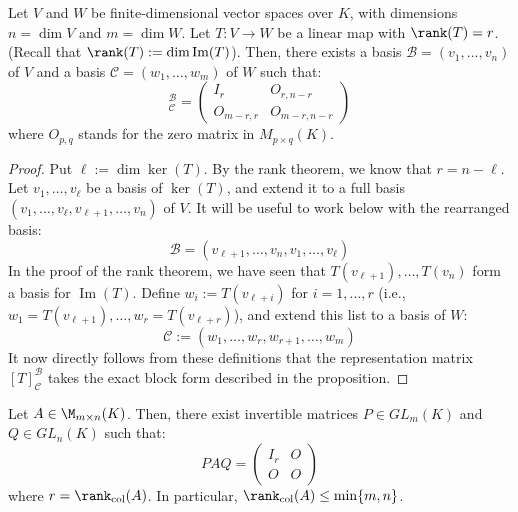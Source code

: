 \begin{proposition}
\label{prop:linear_map_normal_form}
Let $V$ and $W$ be finite-dimensional vector spaces over $K$, with dimensions $n = \dim V$ and $m = \dim W$. Let $T: V \to W$ be a linear map with $\rank(T) = r$. (Recall that $\rank(T) := \dim \operatorname{Im}(T)$). Then, there exists a basis $\mathcal{B} = (v_1, \dots, v_n)$ of $V$ and a basis $\mathcal{C} = (w_1, \dots, w_m)$ of $W$ such that:
\begin{equation*}
    [T]_{\mathcal{C}}^{\mathcal{B}} = \begin{pmatrix} I_r & O_{r, n-r} \\ O_{m-r, r} & O_{m-r, n-r} \end{pmatrix}
\end{equation*}
where $O_{p,q}$ stands for the zero matrix in $M_{p \times q}(K)$.
\end{proposition}

\begin{proof}
Put $\ell := \dim \ker(T)$. By the rank theorem, we know that $r = n - \ell$. Let $v_1, \dots, v_\ell$ be a basis of $\ker(T)$, and extend it to a full basis $(v_1, \dots, v_\ell, v_{\ell+1}, \dots, v_n)$ of $V$. It will be useful to work below with the rearranged basis:
\begin{equation*}
    \mathcal{B} = (v_{\ell+1}, \dots, v_n, v_1, \dots, v_\ell)
\end{equation*}
In the proof of the rank theorem, we have seen that $T(v_{\ell+1}), \dots, T(v_n)$ form a basis for $\operatorname{Im}(T)$. Define $w_i := T(v_{\ell+i})$ for $i = 1, \dots, r$ (i.e., $w_1 = T(v_{\ell+1}), \dots, w_r = T(v_{\ell+r})$), and extend this list to a basis of $W$:
\begin{equation*}
    \mathcal{C} := (w_1, \dots, w_r, w_{r+1}, \dots, w_m)
\end{equation*}
It now directly follows from these definitions that the representation matrix $[T]_{\mathcal{C}}^{\mathcal{B}}$ takes the exact block form described in the proposition.
\end{proof}

\begin{corollary}
\label{cor:matrix_equivalence_normal_form}
Let $A \in \M_{m \times n}(K)$. Then, there exist invertible matrices $P \in GL_m(K)$ and $Q \in GL_n(K)$ such that:
\begin{equation*}
    PAQ = \begin{pmatrix} I_r & O \\ O & O \end{pmatrix}
\end{equation*}
where $r = \rank_{\text{col}}(A)$. In particular, $\rank_{\text{col}}(A) \le \min\{m, n\}$.
\end{corollary}

